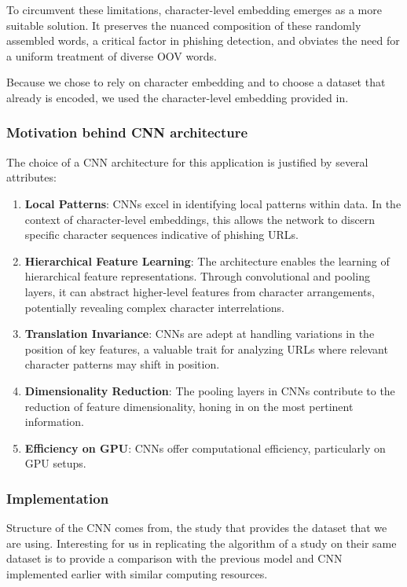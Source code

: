 \documentclass{article}
\begin{document}
    To circumvent these limitations, character-level embedding emerges as a more suitable solution.
    It preserves the nuanced composition of these randomly assembled words, a critical factor in phishing detection, and obviates the need for a uniform treatment of diverse OOV words.

    Because we chose to rely on character embedding and to choose a dataset that already is encoded, we used the character-level embedding provided in\cite{CharacterLevelCNN}.

    \subsubsection{Motivation behind CNN architecture}

    The choice of a CNN architecture for this application is justified by several attributes:
    \begin{enumerate}
        \item \textbf{Local Patterns}: CNNs excel in identifying local patterns within data.
        In the context of character-level embeddings, this allows the network to discern specific character sequences indicative of phishing URLs.
        \item \textbf{Hierarchical Feature Learning}: The architecture enables the learning of hierarchical feature representations.
        Through convolutional and pooling layers, it can abstract higher-level features from character arrangements, potentially revealing complex character interrelations.
        \item \textbf{Translation Invariance}: CNNs are adept at handling variations in the position of key features, a valuable trait for analyzing URLs where relevant character patterns may shift in position.
        \item \textbf{Dimensionality Reduction}: The pooling layers in CNNs contribute to the reduction of feature dimensionality, honing in on the most pertinent information.
        \item \textbf{Efficiency on GPU}: CNNs offer computational efficiency, particularly on GPU setups.
    \end{enumerate}

    \subsubsection{Implementation}
    Structure of the CNN comes from\cite{CharacterLevelCNN}, the study that provides the dataset that we are using.
    Interesting for us in replicating the algorithm of a study on their same dataset is to provide a comparison with the previous model and CNN implemented earlier with similar computing resources.
\end{document}
